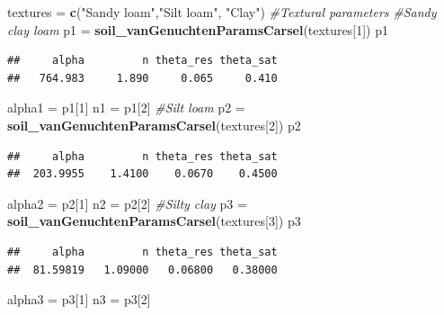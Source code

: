 \documentclass[]{book}
\newenvironment{Shaded}{\begin{snugshade}}{\end{snugshade}}
\newcommand{\KeywordTok}[1]{\textcolor[rgb]{0.13,0.29,0.53}{\textbf{#1}}}
\newcommand{\DecValTok}[1]{\textcolor[rgb]{0.00,0.00,0.81}{#1}}
\newcommand{\StringTok}[1]{\textcolor[rgb]{0.31,0.60,0.02}{#1}}
\newcommand{\CommentTok}[1]{\textcolor[rgb]{0.56,0.35,0.01}{\textit{#1}}}
\newcommand{\NormalTok}[1]{#1}
\begin{document}
\begin{Shaded}
\begin{Highlighting}[]
\NormalTok{textures =}\StringTok{ }\KeywordTok{c}\NormalTok{(}\StringTok{"Sandy loam"}\NormalTok{,}\StringTok{"Silt loam"}\NormalTok{, }\StringTok{"Clay"}\NormalTok{)}
\CommentTok{#Textural parameters}
\CommentTok{#Sandy clay loam }
\NormalTok{p1 =}\StringTok{ }\KeywordTok{soil_vanGenuchtenParamsCarsel}\NormalTok{(textures[}\DecValTok{1}\NormalTok{])}
\NormalTok{p1}
\end{Highlighting}
\end{Shaded}

\begin{verbatim}
##     alpha         n theta_res theta_sat 
##   764.983     1.890     0.065     0.410
\end{verbatim}

\begin{Shaded}
\begin{Highlighting}[]
\NormalTok{alpha1 =}\StringTok{ }\NormalTok{p1[}\DecValTok{1}\NormalTok{]  }
\NormalTok{n1 =}\StringTok{ }\NormalTok{p1[}\DecValTok{2}\NormalTok{]}
\CommentTok{#Silt loam}
\NormalTok{p2 =}\StringTok{ }\KeywordTok{soil_vanGenuchtenParamsCarsel}\NormalTok{(textures[}\DecValTok{2}\NormalTok{])}
\NormalTok{p2}
\end{Highlighting}
\end{Shaded}

\begin{verbatim}
##     alpha         n theta_res theta_sat 
##  203.9955    1.4100    0.0670    0.4500
\end{verbatim}

\begin{Shaded}
\begin{Highlighting}[]
\NormalTok{alpha2 =}\StringTok{  }\NormalTok{p2[}\DecValTok{1}\NormalTok{]}
\NormalTok{n2 =}\StringTok{ }\NormalTok{p2[}\DecValTok{2}\NormalTok{]}
\CommentTok{#Silty clay}
\NormalTok{p3 =}\StringTok{ }\KeywordTok{soil_vanGenuchtenParamsCarsel}\NormalTok{(textures[}\DecValTok{3}\NormalTok{])}
\NormalTok{p3}
\end{Highlighting}
\end{Shaded}

\begin{verbatim}
##     alpha         n theta_res theta_sat 
##  81.59819   1.09000   0.06800   0.38000
\end{verbatim}

\begin{Shaded}
\begin{Highlighting}[]
\NormalTok{alpha3 =}\StringTok{  }\NormalTok{p3[}\DecValTok{1}\NormalTok{]}
\NormalTok{n3 =}\StringTok{ }\NormalTok{p3[}\DecValTok{2}\NormalTok{]}
\end{Highlighting}
\end{Shaded}
\end{document}

